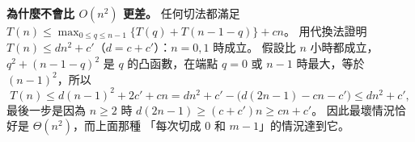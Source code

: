 \begin{pastsoln}
\textbf{為什麼不會比 $O(n^2)$ 更差。} 任何切法都滿足 $T(n) \le \max_{0 \le q \le n-1}\{T(q) + T(n-1-q)\} + cn$。
用代換法證明 $T(n) \le dn^2 + c'$（$d = c + c'$）：$n = 0, 1$ 時成立。 假設比 $n$ 小時都成立，
$q^2 + (n-1-q)^2$ 是 $q$ 的凸函數，在端點 $q = 0$ 或 $n - 1$ 時最大，等於 $(n-1)^2$，所以
\[
T(n) \le d(n-1)^2 + 2c' + cn = dn^2 + c' - \bigl(d(2n - 1) - cn - c'\bigr) \le dn^2 + c',
\]
最後一步是因為 $n \ge 2$ 時 $d(2n-1) \ge (c + c')n \ge cn + c'$。 因此最壞情況恰好是 $\Theta(n^2)$，而上面那種
「每次切成 $0$ 和 $m - 1$」的情況達到它。
\end{pastsoln}
